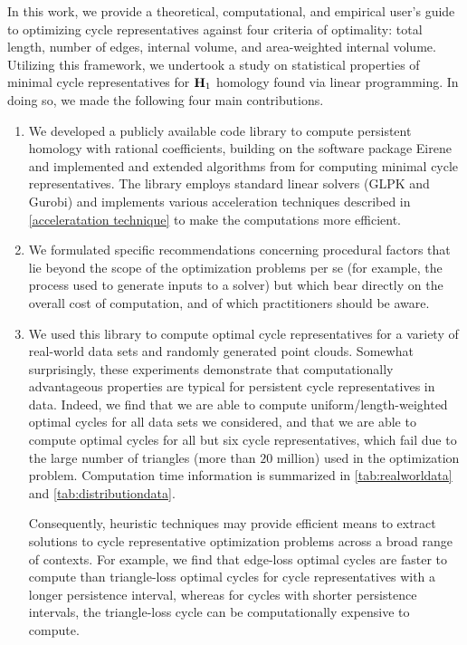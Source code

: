 In this work, we provide a theoretical, computational, and empirical user's guide to optimizing cycle representatives against four criteria of optimality: total length, number of edges, internal volume, and area-weighted internal volume. Utilizing this framework, we undertook a study on statistical properties of minimal cycle representatives for $\mathbf{H}_1$ homology found via linear programming. In doing so, we made the following four main contributions.
\begin{enumerate}
    \item We developed a publicly available code library \cite{li_thompson} to compute persistent homology with rational coefficients, building on the software package Eirene \cite{eirene} and implemented and extended algorithms from \cite{Escolar2016, Obayashi2018}  for computing minimal cycle representatives. The library employs standard linear solvers (GLPK and Gurobi) and implements various acceleration techniques described in \se \ref{acceleratation technique} to make the computations more efficient. 
    \item We formulated specific recommendations concerning procedural factors that lie beyond the scope of the optimization problems per se (for example, the process used to generate inputs to a solver) but which bear directly on the overall cost of computation, and of which practitioners should be aware. 
    \item We used this library to compute optimal cycle representatives for a variety of real-world data sets and randomly generated point clouds.  Somewhat surprisingly, these experiments demonstrate that computationally advantageous properties are typical for persistent cycle representatives in data. Indeed, we find that we are able to compute uniform/length-weighted optimal cycles for all data sets we considered, and that we are able to compute \DIFdelbegin {}\DIFdelend \DIFaddbegin {}\DIFaddend optimal cycles for all but six cycle representatives, which fail due to the large number of triangles (more than $20$ million) used in the optimization problem. Computation time information is summarized in \tab \ref{tab:realworldata} and \tab \ref{tab:distributiondata}. 

    Consequently, heuristic techniques may provide efficient means to extract solutions to cycle representative optimization problems across a broad range of contexts. For example, we find that edge-loss optimal cycles are faster to compute than triangle-loss optimal cycles for cycle representatives with a longer persistence interval, whereas for cycles with shorter persistence intervals, the triangle-loss cycle can be \DIFdelbegin {}\DIFdelend \DIFaddbegin {}\DIFaddend computationally expensive to compute.


\end{enumerate}
